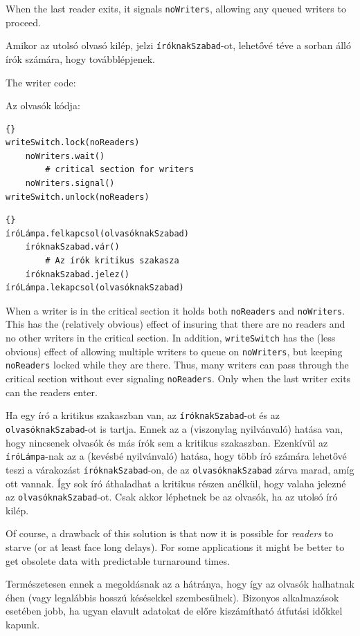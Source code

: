 \documentclass{book}
\begin{document}
When the last reader exits, it signals {\tt noWriters},
allowing any queued writers to proceed.

Amikor az utolsó olvasó kilép, jelzi {\tt íróknakSzabad}-ot, lehetővé
téve a sorban álló írók számára, hogy továbblépjenek.

The writer code:

Az olvasók kódja:

\begin{lstlisting}[title={Writer-priority writer solution}]{}
writeSwitch.lock(noReaders)
    noWriters.wait()
        # critical section for writers
    noWriters.signal()
writeSwitch.unlock(noReaders)
\end{lstlisting}

\begin{lstlisting}[title={Író prioritásos író megoldás}]{}
íróLámpa.felkapcsol(olvasóknakSzabad)
    íróknakSzabad.vár()
        # Az írók kritikus szakasza
    íróknakSzabad.jelez()
íróLámpa.lekapcsol(olvasóknakSzabad)
\end{lstlisting}

When a writer is in the critical section it holds both
{\tt noReaders} and {\tt noWriters}.  This has the
(relatively obvious) effect of insuring that there are
no readers and no other writers in the critical section.
In addition, {\tt writeSwitch} has the (less obvious) effect of
allowing multiple writers to queue on {\tt noWriters},
but keeping {\tt noReaders} locked while they are
there.  Thus, many writers can pass through the critical
section without ever signaling
{\tt noReaders}.  Only when the last writer exits can
the readers enter.

Ha egy író a kritikus szakaszban van, az {\tt íróknakSzabad}-ot és az
{\tt olvasóknakSzabad}-ot is tartja. Ennek az a (viszonylag nyilvánvaló) hatása
van, hogy nincsenek olvasók és más 
írók sem a kritikus szakaszban. Ezenkívül az {\tt íróLámpa}-nak
az a (kevésbé nyilvánvaló) hatása, hogy több író számára lehetővé 
teszi a várakozást {\tt íróknakSzabad}-on, de az {\tt olvasóknakSzabad} zárva marad, 
amíg ott vannak. Így sok író áthaladhat a kritikus részen anélkül, 
hogy valaha jelezné az {\tt olvasóknakSzabad}-ot. Csak akkor léphetnek be az 
olvasók, ha az utolsó író kilép.

Of course, a drawback of this solution is that now it is
possible for {\em readers} to starve (or at least face long
delays).  For some applications it might be better to get
obsolete data with predictable turnaround times.

Természetesen ennek a megoldásnak az a hátránya, hogy így az
olvasók halhatnak éhen (vagy legalábbis hosszú késésekkel szembesülnek).
Bizonyos alkalmazások esetében jobb, ha ugyan elavult adatokat de előre
kiszámítható átfutási időkkel kapunk.
\end{document}
